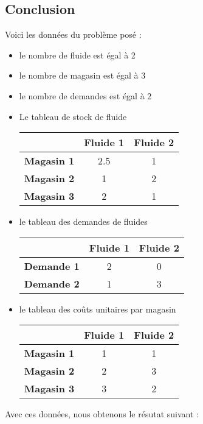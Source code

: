 \subsection{Conclusion}

Voici les données du problème posé :

\begin{itemize}
\item le nombre de fluide est égal à 2
\item le nombre de magasin est égal à 3
\item le nombre de demandes est égal à 2
\item Le tableau de stock de fluide \\

\begin{tabular}{|c|c|c|}
\hline
\textbf{} & \textbf{Fluide 1} & \textbf{Fluide 2} \\
\hline
\textbf{Magasin 1} & 2.5 & 1 \\
\textbf{Magasin 2} & 1 & 2 \\
\textbf{Magasin 3} & 2 & 1 \\
\hline
\end{tabular}

\item le tableau des demandes de fluides \\

\begin{tabular}{|c|c|c|}
\hline
\textbf{} & \textbf{Fluide 1} & \textbf{Fluide 2} \\
\hline
\textbf{Demande 1} & 2 & 0 \\
\textbf{Demande 2} & 1 & 3 \\
\hline
\end{tabular}


\item le tableau des coûts unitaires par magasin \\

\begin{tabular}{|c|c|c|}
\hline
\textbf{} & \textbf{Fluide 1} & \textbf{Fluide 2} \\
\hline
\textbf{Magasin 1} & 1 & 1 \\
\textbf{Magasin 2} & 2 & 3 \\
\textbf{Magasin 3} & 3 & 2 \\
\hline
\end{tabular}


\end{itemize}

Avec ces données, nous obtenons le résutat suivant :


